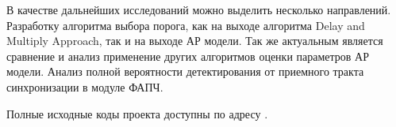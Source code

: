 В качестве дальнейших исследований можно выделить несколько направлений. Разработку алгоритма выбора порога, как на выходе алгоритма Delay and Multiply Approach,
так и на выходе АР модели. Так же актуальным является сравнение и анализ применение других алгоритмов оценки параметров АР модели. Анализ полной вероятности
детектирования от приемного тракта синхронизации в модуле ФАПЧ.

Полные исходные коды проекта доступны по адресу \cite{phdSRC}.

\newpage
